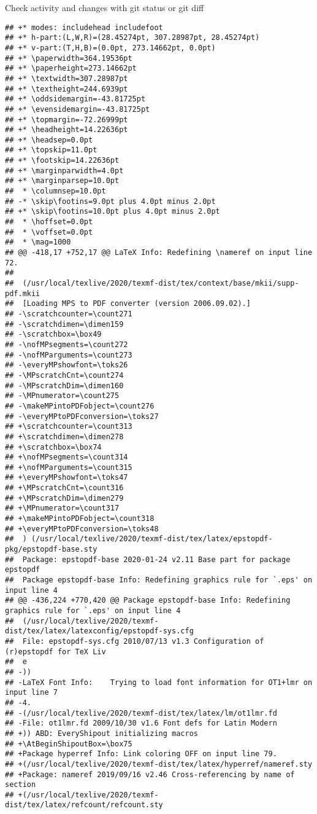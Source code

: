 \documentclass[ignorenonframetext,]{beamer}
\begin{document}
\begin{frame}[fragile]{Check activity and changes with git status or git
diff}
\begin{verbatim}
## +* modes: includehead includefoot 
## +* h-part:(L,W,R)=(28.45274pt, 307.28987pt, 28.45274pt)
## +* v-part:(T,H,B)=(0.0pt, 273.14662pt, 0.0pt)
## +* \paperwidth=364.19536pt
## +* \paperheight=273.14662pt
## +* \textwidth=307.28987pt
## +* \textheight=244.6939pt
## +* \oddsidemargin=-43.81725pt
## +* \evensidemargin=-43.81725pt
## +* \topmargin=-72.26999pt
## +* \headheight=14.22636pt
## +* \headsep=0.0pt
## +* \topskip=11.0pt
## +* \footskip=14.22636pt
## +* \marginparwidth=4.0pt
## +* \marginparsep=10.0pt
##  * \columnsep=10.0pt
## -* \skip\footins=9.0pt plus 4.0pt minus 2.0pt
## +* \skip\footins=10.0pt plus 4.0pt minus 2.0pt
##  * \hoffset=0.0pt
##  * \voffset=0.0pt
##  * \mag=1000
## @@ -418,17 +752,17 @@ LaTeX Info: Redefining \nameref on input line 72.
##  
##  (/usr/local/texlive/2020/texmf-dist/tex/context/base/mkii/supp-pdf.mkii
##  [Loading MPS to PDF converter (version 2006.09.02).]
## -\scratchcounter=\count271
## -\scratchdimen=\dimen159
## -\scratchbox=\box49
## -\nofMPsegments=\count272
## -\nofMParguments=\count273
## -\everyMPshowfont=\toks26
## -\MPscratchCnt=\count274
## -\MPscratchDim=\dimen160
## -\MPnumerator=\count275
## -\makeMPintoPDFobject=\count276
## -\everyMPtoPDFconversion=\toks27
## +\scratchcounter=\count313
## +\scratchdimen=\dimen278
## +\scratchbox=\box74
## +\nofMPsegments=\count314
## +\nofMParguments=\count315
## +\everyMPshowfont=\toks47
## +\MPscratchCnt=\count316
## +\MPscratchDim=\dimen279
## +\MPnumerator=\count317
## +\makeMPintoPDFobject=\count318
## +\everyMPtoPDFconversion=\toks48
##  ) (/usr/local/texlive/2020/texmf-dist/tex/latex/epstopdf-pkg/epstopdf-base.sty
##  Package: epstopdf-base 2020-01-24 v2.11 Base part for package epstopdf
##  Package epstopdf-base Info: Redefining graphics rule for `.eps' on input line 4
## @@ -436,224 +770,420 @@ Package epstopdf-base Info: Redefining graphics rule for `.eps' on input line 4
##  (/usr/local/texlive/2020/texmf-dist/tex/latex/latexconfig/epstopdf-sys.cfg
##  File: epstopdf-sys.cfg 2010/07/13 v1.3 Configuration of (r)epstopdf for TeX Liv
##  e
## -))
## -LaTeX Font Info:    Trying to load font information for OT1+lmr on input line 7
## -4.
## -(/usr/local/texlive/2020/texmf-dist/tex/latex/lm/ot1lmr.fd
## -File: ot1lmr.fd 2009/10/30 v1.6 Font defs for Latin Modern
## +)) ABD: EveryShipout initializing macros
## +\AtBeginShipoutBox=\box75
## +Package hyperref Info: Link coloring OFF on input line 79.
## +(/usr/local/texlive/2020/texmf-dist/tex/latex/hyperref/nameref.sty
## +Package: nameref 2019/09/16 v2.46 Cross-referencing by name of section
## +(/usr/local/texlive/2020/texmf-dist/tex/latex/refcount/refcount.sty

\end{verbatim}
\end{frame}
\end{document}
